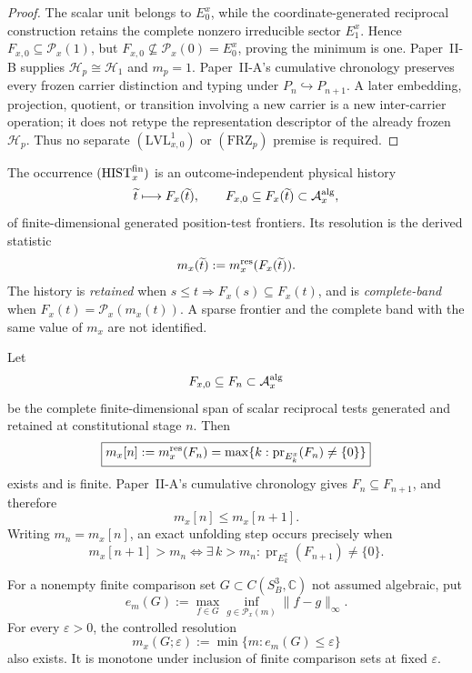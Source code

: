 \documentclass[12pt,a4paper]{article}
\begin{document}
\begin{proof}
The scalar unit belongs to \(E_0^x\), while the coordinate-generated
reciprocal construction retains the complete nonzero irreducible sector
\(E_1^x\).  Hence \(F_{x,0}\subseteq\mathcal P_x(1)\), but
\(F_{x,0}\not\subseteq\mathcal P_x(0)=E_0^x\), proving the minimum is one.
Paper~II-B supplies \(\mathcal H_p\cong\mathcal H_1\) and \(m_p=1\).
Paper~II-A's cumulative chronology preserves every frozen carrier distinction
and typing under \(P_n\hookrightarrow P_{n+1}\).  A later embedding,
projection, quotient, or transition involving a new carrier is a new
inter-carrier operation; it does not retype the representation descriptor of
the already frozen \(\mathcal H_p\).  Thus no separate
\((\mathrm{LVL}_{x,0}^{1})\) or \((\mathrm{FRZ}_p)\) premise is required.
\end{proof}

\begin{definition}
\label{p2c:def:finite-position-frontier-history}
The occurrence \((\mathrm{HIST}_x^{\rm fin})\) is an outcome-independent
physical history
\[
 \widetilde t\longmapsto F_x(\widetilde t),
 \qquad
 F_{x,0}\subseteq F_x(\widetilde t)\subset\mathcal A_x^{\rm alg},
\]
of finite-dimensional generated position-test frontiers.  Its resolution is
the derived statistic
\[
 m_x(\widetilde t):=m_x^{\rm res}(F_x(\widetilde t)).
\]
The history is \emph{retained} when
\(s\le t\Rightarrow F_x(s)\subseteq F_x(t)\), and is
\emph{complete-band} when
\(F_x(t)=\mathcal P_x(m_x(t))\).  A sparse frontier and the complete band
with the same value of \(m_x\) are not identified.
\end{definition}

\begin{proposition}
\label{p2c:prop:least-generated-position-resolution}
Let
\[
        F_{x,0}\subseteq F_n\subset\mathcal A_x^{\rm alg}
\]
be the complete finite-dimensional span of scalar reciprocal tests generated
and retained at constitutional stage \(n\).  Then
\[
 \boxed{
 m_x[n]
 :=m_x^{\rm res}(F_n)
 =\max\{k:\operatorname{pr}_{E_k^x}(F_n)\ne\{0\}\}}
\]
exists and is finite.  Paper~II-A's cumulative chronology gives
\(F_n\subseteq F_{n+1}\), and therefore
\[
        m_x[n]\le m_x[n+1].
\]
Writing \(m_n=m_x[n]\), an exact unfolding step occurs precisely when
\[
 \boxed{
 m_x[n+1]>m_n
 \iff
 \exists\,k>m_n:
 \operatorname{pr}_{E_k^x}(F_{n+1})\ne\{0\}.}
\]

For a nonempty finite comparison set
\(G\subset C(S^3_B,\mathbb C)\) not assumed algebraic, put
\[
 e_m(G):=\max_{f\in G}\inf_{g\in\mathcal P_x(m)}
             \|f-g\|_\infty.
\]
For every \(\varepsilon>0\), the controlled resolution
\[
 m_x(G;\varepsilon)
 :=\min\{m:e_m(G)\le\varepsilon\}
\]
also exists.  It is monotone under inclusion of finite comparison sets at
fixed \(\varepsilon\).
\end{proposition}
\end{document}

